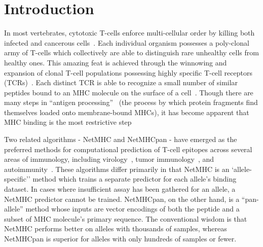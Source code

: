 \section{Introduction}
In most vertebrates, cytotoxic T-cells enforce multi-cellular order by killing both infected and cancerous cells~\cite{Anderson_2004}. Each individual organism possesses a poly-clonal army of T-cells which collectively are able to distinguish rare unhealthy cells from healthy ones. This amazing feat is achieved through the winnowing and expansion of clonal T-cell populations possessing highly specific T-cell receptors (TCRs)~\cite{Blackman_1990}. Each distinct TCR is able to recognize a small number of similar peptides bound to an MHC molecule on the surface of a cell~\cite{Huseby_2005}. Though there are many steps in ``antigen processing''~\cite{Cresswell_2005} (the process by which protein fragments find themselves loaded onto membrane-bound MHCs), it has become apparent that MHC binding is the most restrictive step

Two related algorithms - NetMHC and NetMHCpan - have emerged as the preferred methods for computational prediction of T-cell epitopes across several areas of immunology, including virology~\cite{Lund_2011}, tumor immunology~\cite{Gubin_2015}, and autoimmunity~\cite{Abreu_2012}. These algorithms differ primarily in that NetMHC is an `allele-specific'' method which trains a separate predictor for each allele's binding dataset. In cases where insufficient assay has been gathered for an allele, a NetMHC predictor cannot be trained. NetMHCpan, on the other hand, is a ``pan-allele'' method whose inputs are vector encodings of both the peptide and a subset of MHC molecule's primary sequence. The conventional wisdom is that NetMHC performs better on alleles with thousands of samples, whereas NetMHCpan is superior for alleles with only hundreds of samples or fewer. 


